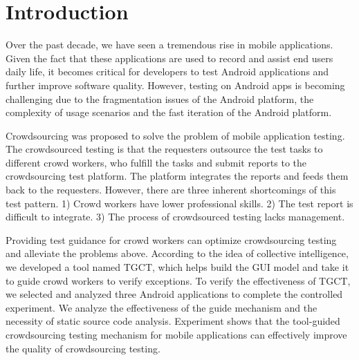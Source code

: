 \section{Introduction}
Over the past decade, we have seen a tremendous rise in mobile applications. Given the fact that these applications are used to record and assist end users daily life, it becomes critical for developers to test Android applications and further improve software quality. However, testing on Android apps is becoming challenging due to the fragmentation issues of the Android platform\cite{park2013fragmentation}, the complexity of usage scenarios and the fast iteration of the Android platform.

Crowdsourcing was proposed to solve the problem of mobile application testing. The crowdsourced testing is that the requesters outsource the test tasks to different crowd workers, who fulfill the tasks and submit reports to the crowdsourcing test platform. The platform integrates the reports and feeds them back to the requesters\cite{feng2015test}. However, there are three inherent shortcomings of this test pattern. 1) Crowd workers have lower professional skills. 2) The test report is difficult to integrate. 3) The process of crowdsourced testing lacks management. 

Providing test guidance for crowd workers can optimize crowdsourcing testing and alleviate the problems above\cite{zhang2016guiding}. According to the idea of collective intelligence\cite{woolley2010evidence}, we developed a tool named TGCT, which helps build the GUI model and take it to guide crowd workers to verify exceptions. To verify the effectiveness of TGCT, we selected and analyzed three Android applications to complete the controlled experiment. We analyze the effectiveness of the guide mechanism and the necessity of static source code analysis. Experiment shows that the tool-guided crowdsourcing testing mechanism for mobile applications can effectively improve the quality of crowdsourcing testing.




